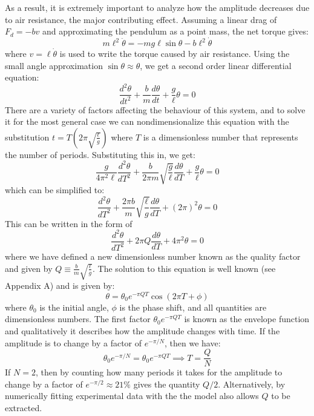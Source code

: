 \documentclass[%
 reprint,
 amsmath,amssymb
 aps,
]{revtex4-2}
\begin{document}
As a result, it is extremely important to analyze how the amplitude decreases due to air resistance, the major contributing effect. Assuming a linear drag of $F_d=-bv$ and approximating the pendulum as a point mass, the net torque gives:
\begin{equation}
    m\ell^2 \ddot{\theta} = -mg\ell\sin\theta-b\ell^2\dot{\theta}
    \label{eq:}
\end{equation}
where $v=\ell\dot{\theta}$ is used to write the torque caused by air resistance. Using the small angle approximation $\sin\theta \approx \theta$, we get a second order linear differential equation:
\begin{equation}
    \frac{d^2\theta}{dt^2} + \frac{b}{m}\frac{d\theta}{dt} + \frac{g}{\ell}\theta  = 0
\end{equation}
There are a variety of factors affecting the behaviour of this system, and to solve it for the most general case we can nondimensionalize this equation with the substitution $t=T\left(2\pi \sqrt{\frac{\ell}{g}}\right)$ where $T$ is a dimensionless number that represents the number of periods. Substituting this in, we get:
\begin{equation}
    \frac{g}{4\pi^2\ell}\frac{d^2\theta}{dT^2}+\frac{b}{2\pi m}\sqrt{\frac{g}{\ell}}\frac{d\theta}{dT}+\frac{g}{\ell}\theta = 0
    \label{eq:}
\end{equation}
which can be simplified to:
\begin{equation}
    \frac{d^2\theta}{dT^2}+\frac{2\pi b}{m}\sqrt{\frac{\ell}{g}}\frac{d\theta}{dT}+(2\pi)^2\theta = 0
    \label{eq:}
\end{equation}
This can be written in the form of
\begin{equation}
    \frac{d^2\theta}{dT^2}+2\pi Q\frac{d\theta}{dT}+4\pi^2\theta = 0
    \label{eq:}
\end{equation}
where we have defined a new dimensionless number known as the quality factor and given by $Q\equiv \frac{b}{m}\sqrt{\frac{\ell}{g}}$. The solution to this equation is well known (see Appendix A) and is given by:
\begin{equation}
    \theta = \theta_0e^{-\pi QT}\cos\left(2\pi T + \phi\right)
    \label{eq:}
\end{equation}
where $\theta_0$ is the initial angle, $\phi$ is the phase shift, and all quantities are dimensionless numbers. The first factor $\theta_0e^{-\pi QT}$ is known as the envelope function and qualitatively it describes how the amplitude changes with time. If the amplitude is to change by a factor of $e^{-\pi/N}$, then we have:
\begin{equation}
    \theta_0e^{-\pi/N}=\theta_0e^{-\pi QT} \implies T = \frac{Q}{N}
    \label{eq:}
\end{equation}
If $N=2$, then by counting how many periods it takes for the amplitude to change by a factor of $e^{-\pi/2}\approx 21\%$ gives the quantity $Q/2$. Alternatively, by numerically fitting experimental data with the the model also allows $Q$ to be extracted.
\end{document}

